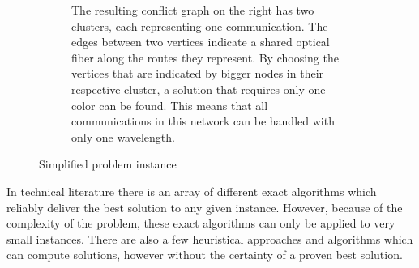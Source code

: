 \documentclass[paper = a4, fontsize = 10pt]{scrartcl}
\begin{document}
\begin{figure}
\begin{subfigure}[t]{0.3\textwidth}
		\caption{The resulting conflict graph on the right has two clusters, each representing one communication. The edges between two vertices indicate a shared optical fiber along the routes they represent. By choosing the vertices that are indicated by bigger nodes in their respective cluster, a solution that requires only one color can be found. This means that all communications in this network can be handled with only one wavelength.}
		\label{fig:example:d}
	\end{subfigure}
    \caption{Simplified problem instance}
    \label{fig:translation}
\end{figure}

In technical literature there is an array of different exact algorithms which reliably deliver the best solution to any given instance. However, because of the complexity of the problem, these exact algorithms can only be applied to very small instances. There are also a few heuristical approaches and algorithms which can compute solutions, however without the certainty of a proven best solution.

\end{document}
